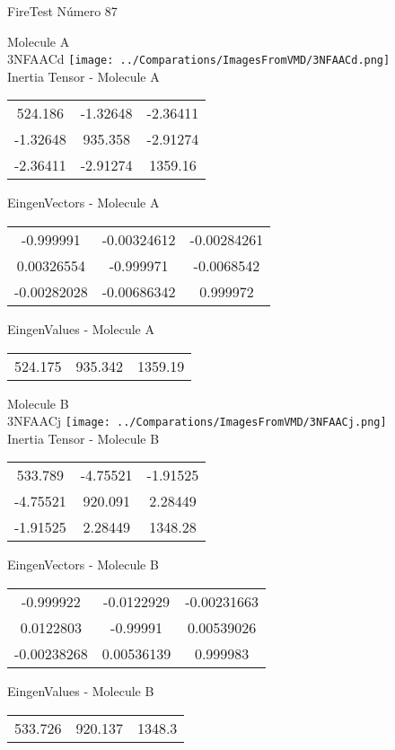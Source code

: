 \vtab[-2cm]
\begin{center}
{\large FireTest \tab Número 87}
\end{center}
\begin{multicols}{2}
\begin{center}

Molecule A \\ 
3NFAACd
\texttt{[image: ../Comparations/ImagesFromVMD/3NFAACd.png]}
\\
Inertia Tensor - Molecule A \\
\vtab

\begin{tabular}{|c c c|}
524.186	 & 	-1.32648	 & 	-2.36411	 \\
-1.32648	 & 	935.358	 & 	-2.91274	 \\
-2.36411	 & 	-2.91274	 & 	1359.16
\end{tabular}

\vtab
 EingenVectors - Molecule A     \\
\vtab
\begin{tabular}{|c c c|}
-0.999991	 & 	-0.00324612	 & 	-0.00284261	 \\
0.00326554	 & 	-0.999971	 & 	-0.0068542	 \\
-0.00282028	 & 	-0.00686342	 & 	0.999972
\end{tabular}

\vtab
 EingenValues - Molecule A     \\
\vtab
\begin{tabular}{|c c c|}
524.175	 & 	935.342	 & 	1359.19	 \\
\end{tabular}
\columnbreak

Molecule B \\ 
3NFAACj
\texttt{[image: ../Comparations/ImagesFromVMD/3NFAACj.png]}
\\
Inertia Tensor - Molecule B \\
\vtab

\begin{tabular}{|c c c|}
533.789	 & 	-4.75521	 & 	-1.91525	 \\
-4.75521	 & 	920.091	 & 	2.28449	 \\
-1.91525	 & 	2.28449	 & 	1348.28
\end{tabular}

\vtab
 EingenVectors - Molecule B     \\
\vtab
\begin{tabular}{|c c c|}
-0.999922	 & 	-0.0122929	 & 	-0.00231663	 \\
0.0122803	 & 	-0.99991	 & 	0.00539026	 \\
-0.00238268	 & 	0.00536139	 & 	0.999983
\end{tabular}

\vtab
 EingenValues - Molecule B     \\
\vtab
\begin{tabular}{|c c c|}
533.726	 & 	920.137	 & 	1348.3	 \\
\end{tabular}

\end{center}
\end{multicols}
